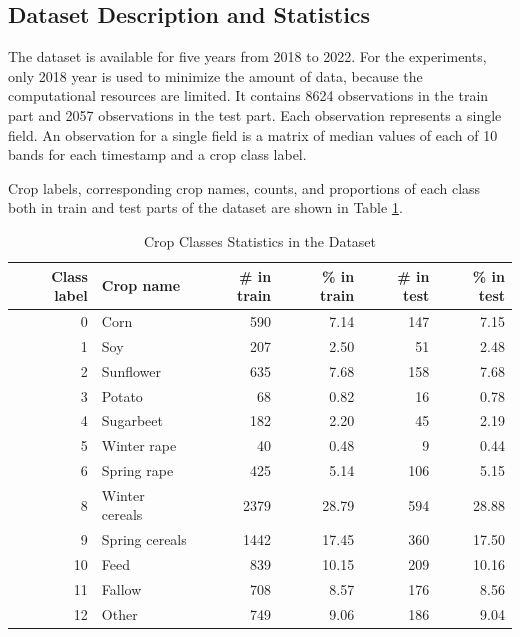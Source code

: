 \documentclass{article}
\begin{document}
\subsection{Dataset Description and Statistics}

The dataset is available for five years from 2018 to 2022. For the experiments, only 2018 year is used to minimize the amount of data, because the computational resources are limited. It contains 8624 observations in the train part and 2057 observations in the test part. Each observation represents a single field. An observation for a single field is a matrix of median values of each of 10 bands for each timestamp and a crop class label.

Crop labels, corresponding crop names, counts, and proportions of each class both in train and test parts of the dataset are shown in Table \ref{Table 2.3.1}.


\begin{table}
\centering
\caption{Crop Classes Statistics in the Dataset}
\label{Table 2.3.1}
\begin{tabular}{rlrrrr}
\toprule
 Class label &      Crop name &  \# in train &  \% in train &  \# in test &  \% in test \\
\midrule
           0 &           Corn &         590 &        7.14 &        147 &       7.15 \\
           1 &            Soy &         207 &        2.50 &         51 &       2.48 \\
           2 &      Sunflower &         635 &        7.68 &        158 &       7.68 \\
           3 &         Potato &          68 &        0.82 &         16 &       0.78 \\
           4 &      Sugarbeet &         182 &        2.20 &         45 &       2.19 \\
           5 &    Winter rape &          40 &        0.48 &          9 &       0.44 \\
           6 &    Spring rape &         425 &        5.14 &        106 &       5.15 \\
           8 & Winter cereals &        2379 &       28.79 &        594 &      28.88 \\
           9 & Spring cereals &        1442 &       17.45 &        360 &      17.50 \\
          10 &           Feed &         839 &       10.15 &        209 &      10.16 \\
          11 &         Fallow &         708 &        8.57 &        176 &       8.56 \\
          12 &          Other &         749 &        9.06 &        186 &       9.04 \\
\bottomrule
\end{tabular}
\end{table}
\end{document}
